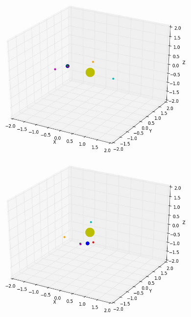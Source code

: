 \documentclass[10pt,letterpaper]{article}
\begin{document}
\begin{figure}[!htb]
  \includegraphics[width=\linewidth]{figures/lagrange_points/lagrange_points_l4_vy_01_1.png}
  \subcaption{}\label{fig:lagrange_points_l4_vy_01_fig1}
\endminipage\hfill
{}
  \includegraphics[width=\linewidth]{figures/lagrange_points/lagrange_points_l4_vy_01_2.png}
  \subcaption{}\label{fig:lagrange_points_l4_vy_01_fig2}
\endminipage\hfill
{}%

\end{figure}
\end{document}
